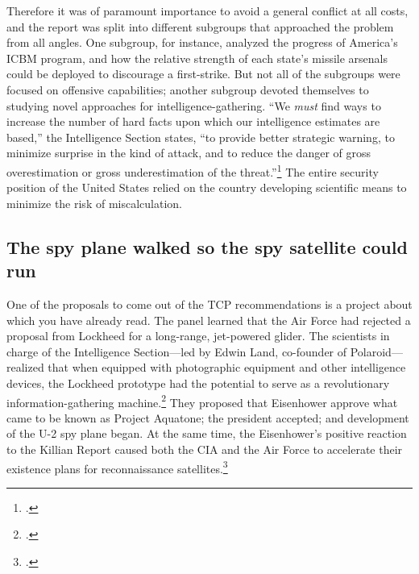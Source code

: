 \documentclass{report}
\begin{document}
Therefore it was of paramount importance to avoid a general conflict at all costs, and the report was split into different subgroups that approached the problem from all angles. One subgroup, for instance, analyzed the progress of America's ICBM program, and how the relative strength of each state's missile arsenals could be deployed to discourage a first-strike. But not all of the subgroups were focused on offensive capabilities; another subgroup devoted themselves to studying novel approaches for intelligence-gathering. ``We \emph{must} find ways to increase the number of hard facts upon which our intelligence estimates are based,'' the Intelligence Section states, ``to provide better strategic warning, to minimize surprise in the kind of attack, and to reduce the danger of gross overestimation or gross underestimation of the threat.''\footcite{technological_capabilities_panel_meeting_1955} The entire security position of the United States relied on the country developing scientific means to minimize the risk of miscalculation.

\subsection{The spy plane walked so the spy satellite could run}
One of the proposals to come out of the TCP recommendations is a project about which you have already read. The panel learned that the Air Force had rejected a proposal from Lockheed for a long-range, jet-powered glider. The scientists in charge of the Intelligence Section---led by Edwin Land, co-founder of Polaroid---realized that when equipped with photographic equipment and other intelligence devices, the Lockheed prototype had the potential to serve as a revolutionary information-gathering machine.\footcite[p.~81-82]{killian_sputnik_1977} They proposed that Eisenhower approve what came to be known as Project Aquatone; the president accepted; and development of the U-2 spy plane began. At the same time, the Eisenhower's positive reaction to the Killian Report caused both the CIA and the Air Force to accelerate their existence plans for reconnaissance satellites.\footcite[p.~83]{killian_sputnik_1977}
\end{document}
